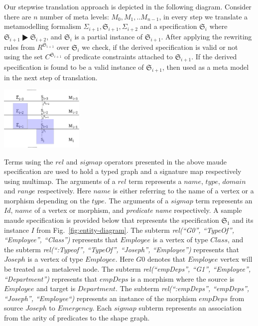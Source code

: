 \documentclass{eceasst}
\begin{document}
Our stepwise translation approach is depicted in the following diagram. Consider there are $n$  number of meta levels: $M_0, M_1, .. M_{n-1}$, in every step we translate a metamodelling formalism 
$\Sigma_{i+1}, \mathfrak{S}_{i+1}, \Sigma_{i+2}$ and a specification $\mathfrak{S}_i$ where $\mathfrak{S}_{i+1} \RHD \mathfrak{S}_{i+2}$, and 
$\mathfrak{S}_{i}$ is a partial instance of $\mathfrak{S}_{i+1}$. After applying the rewriting rules from $R^{\mathfrak{S}_{i+1}}$ over $\mathfrak{S}_{i}$ we check, if the derived specification 
is valid or not using the set $C^{\mathfrak{S}_{i+1}}$ of predicate constraints attached to $\mathfrak{S}_{i+1}$. 
If the derived specification is found to be a valid instance of $\mathfrak{S}_{i+1}$, then used as a meta model in the next step of translation. 

\begin{center}
\includegraphics[width=0.3\textwidth]{stepwise-dpf.pdf}
\end{center}

Terms using the $rel$ and $sigmap$ operators presented in the above maude specification are used to hold a typed graph and a signature map respectively using multimap. 
The arguments of a $rel$ term represents a $name$, $type$, $domain$ and $range$ respectively. 
Here $name$ is either referring to the name of a vertex or a morphism depending on the $type$. 
The arguments of a $sigmap$ term represents an $Id$, $name$ of a vertex or morphism, and \textit{predicate name} respectively. 
A sample maude specification is provided below that represents the specification $\mathfrak{S}_1$ and its instance $I$ from Fig.~\ref{fig:entity-diagram}. 
The subterm \textit{rel(``G0'', ``TypeOf'', ``Employee'', ``Class'')} represents that $Employee$ is a vertex of type $Class$, and 
the subterm \textit{rel(``:Typeof'', ``TypeOf'', ``Joseph'', ``Employee'')} represents that $Joseph$ is a vertex of type $Employee$.
Here $G0$ denotes that $Employee$ vertex will be treated as a metalevel node. 
The subterm \textit{rel(``empDeps'', ``G1'', ``Employee'', ``Department'')} represents that $empDeps$ is a morphism where the source is $Employee$ and target is $Department$. 
The subterm \textit{rel(``:empDeps'', ``empDeps'', ``Joseph'', ``Employee``)} represents an instance of the morphism $empDeps$ from source $Joseph$ to $Emergency$.
Each $sigmap$ subterm represents an association from the arity of predicates to the shape graph. 
\end{document}
